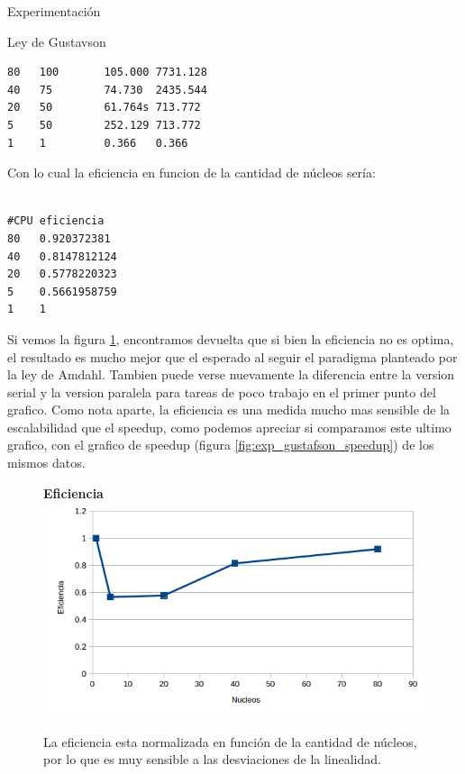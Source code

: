 \begin{section}{Experimentación}
\begin{subsection}{Ley de Gustavson}
\begin{minipage}{\linewidth}
\begin{tcolorbox}[colback=blue!5!white,colframe=blue!75!black,title=Tiempos]
\begin{verbatim}
80   100       105.000 7731.128
40   75        74.730  2435.544
20   50        61.764s 713.772
5    50        252.129 713.772
1    1         0.366   0.366
\end{verbatim}
\end{tcolorbox}
\end{minipage}
Con lo cual la eficiencia en funcion de la cantidad de núcleos sería:
~\\
\begin{minipage}{\linewidth}
\begin{tcolorbox}[colback=blue!5!white,colframe=blue!75!black,title=Eficiencia]
\begin{verbatim}

#CPU eficiencia
80   0.920372381
40   0.8147812124
20   0.5778220323
5    0.5661958759
1    1
\end{verbatim}
\end{tcolorbox}
\end{minipage}

Si vemos la figura \ref{fig:exp_gustafson_eficiency}, encontramos devuelta que si bien la eficiencia no es optima, el resultado es mucho mejor que el esperado al seguir el paradigma planteado por la ley de Amdahl. Tambien puede verse nuevamente la diferencia entre la version serial y la version paralela para tareas de poco trabajo en el primer punto del grafico.
Como nota aparte, la eficiencia es una medida mucho mas sensible de la escalabilidad que el speedup, como podemos apreciar si comparamos este ultimo grafico, con el grafico de speedup (figura \ref{fig:exp_gustafson_speedup}) de los mismos datos.





\begin{figure}
\textbf{Eficiencia}
\includegraphics[width=\textwidth/2,height=\textheight/2,keepaspectratio]{figures/exp_gustafson_eficiency}
\caption{La eficiencia esta normalizada en función de la cantidad de núcleos, por lo que es muy sensible a las desviaciones de la linealidad.}
\label{fig:exp_gustafson_eficiency}
\end{figure}



\end{subsection}
\end{section}
